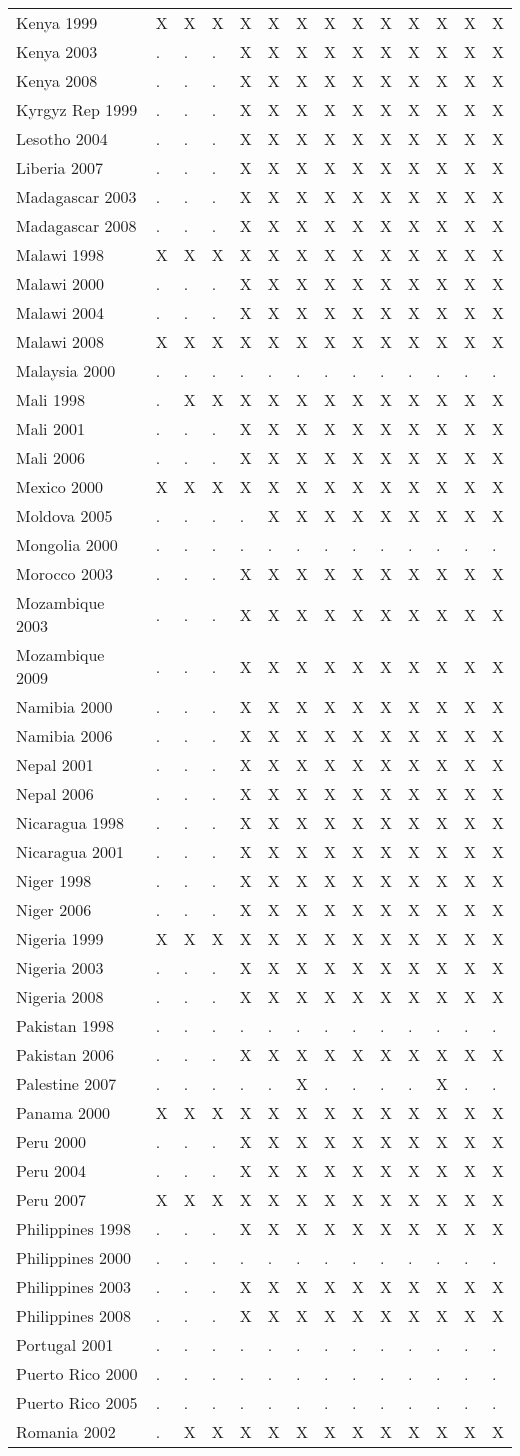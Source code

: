 \documentclass[a4paper]{article}
\begin{document}
\begin{longtable}{llllllllllllll}
Kenya 1999&X&X&X&X&X&X&X&X&X&X&X&X&X\tabularnewline
Kenya 2003&.&.&.&X&X&X&X&X&X&X&X&X&X\tabularnewline
\newpage
Kenya 2008&.&.&.&X&X&X&X&X&X&X&X&X&X\tabularnewline
Kyrgyz Rep 1999&.&.&.&X&X&X&X&X&X&X&X&X&X\tabularnewline
Lesotho 2004&.&.&.&X&X&X&X&X&X&X&X&X&X\tabularnewline
Liberia 2007&.&.&.&X&X&X&X&X&X&X&X&X&X\tabularnewline
Madagascar 2003&.&.&.&X&X&X&X&X&X&X&X&X&X\tabularnewline
Madagascar 2008&.&.&.&X&X&X&X&X&X&X&X&X&X\tabularnewline
Malawi 1998&X&X&X&X&X&X&X&X&X&X&X&X&X\tabularnewline
Malawi 2000&.&.&.&X&X&X&X&X&X&X&X&X&X\tabularnewline
Malawi 2004&.&.&.&X&X&X&X&X&X&X&X&X&X\tabularnewline
Malawi 2008&X&X&X&X&X&X&X&X&X&X&X&X&X\tabularnewline
Malaysia 2000&.&.&.&.&.&.&.&.&.&.&.&.&.\tabularnewline
Mali 1998&.&X&X&X&X&X&X&X&X&X&X&X&X\tabularnewline
Mali 2001&.&.&.&X&X&X&X&X&X&X&X&X&X\tabularnewline
Mali 2006&.&.&.&X&X&X&X&X&X&X&X&X&X\tabularnewline
Mexico 2000&X&X&X&X&X&X&X&X&X&X&X&X&X\tabularnewline
Moldova 2005&.&.&.&.&X&X&X&X&X&X&X&X&X\tabularnewline
Mongolia 2000&.&.&.&.&.&.&.&.&.&.&.&.&.\tabularnewline
Morocco 2003&.&.&.&X&X&X&X&X&X&X&X&X&X\tabularnewline
Mozambique 2003&.&.&.&X&X&X&X&X&X&X&X&X&X\tabularnewline
Mozambique 2009&.&.&.&X&X&X&X&X&X&X&X&X&X\tabularnewline
Namibia 2000&.&.&.&X&X&X&X&X&X&X&X&X&X\tabularnewline
Namibia 2006&.&.&.&X&X&X&X&X&X&X&X&X&X\tabularnewline
Nepal 2001&.&.&.&X&X&X&X&X&X&X&X&X&X\tabularnewline
Nepal 2006&.&.&.&X&X&X&X&X&X&X&X&X&X\tabularnewline
Nicaragua 1998&.&.&.&X&X&X&X&X&X&X&X&X&X\tabularnewline
Nicaragua 2001&.&.&.&X&X&X&X&X&X&X&X&X&X\tabularnewline
Niger 1998&.&.&.&X&X&X&X&X&X&X&X&X&X\tabularnewline
Niger 2006&.&.&.&X&X&X&X&X&X&X&X&X&X\tabularnewline
Nigeria 1999&X&X&X&X&X&X&X&X&X&X&X&X&X\tabularnewline
Nigeria 2003&.&.&.&X&X&X&X&X&X&X&X&X&X\tabularnewline
Nigeria 2008&.&.&.&X&X&X&X&X&X&X&X&X&X\tabularnewline
Pakistan 1998&.&.&.&.&.&.&.&.&.&.&.&.&.\tabularnewline
Pakistan 2006&.&.&.&X&X&X&X&X&X&X&X&X&X\tabularnewline
Palestine 2007&.&.&.&.&.&X&.&.&.&.&X&.&.\tabularnewline
Panama 2000&X&X&X&X&X&X&X&X&X&X&X&X&X\tabularnewline
Peru 2000&.&.&.&X&X&X&X&X&X&X&X&X&X\tabularnewline
Peru 2004&.&.&.&X&X&X&X&X&X&X&X&X&X\tabularnewline
Peru 2007&X&X&X&X&X&X&X&X&X&X&X&X&X\tabularnewline
Philippines 1998&.&.&.&X&X&X&X&X&X&X&X&X&X\tabularnewline
Philippines 2000&.&.&.&.&.&.&.&.&.&.&.&.&.\tabularnewline
\newpage
Philippines 2003&.&.&.&X&X&X&X&X&X&X&X&X&X\tabularnewline
Philippines 2008&.&.&.&X&X&X&X&X&X&X&X&X&X\tabularnewline
Portugal 2001&.&.&.&.&.&.&.&.&.&.&.&.&.\tabularnewline
Puerto Rico 2000&.&.&.&.&.&.&.&.&.&.&.&.&.\tabularnewline
Puerto Rico 2005&.&.&.&.&.&.&.&.&.&.&.&.&.\tabularnewline
Romania 2002&.&X&X&X&X&X&X&X&X&X&X&X&X\tabularnewline

\end{longtable}
\end{document}
